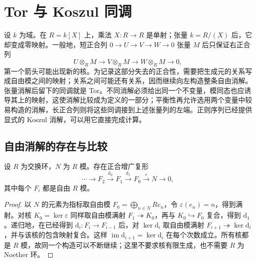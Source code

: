 
\section{Tor 与 Koszul 同调}
\label{b3:sec:1505}

设 \(k\) 为域。在 \(R=k[X]\) 上，乘法 \(X:R\rightarrow R\) 是单射；张量 \(k=R/(X)\) 后，它却变成零映射。一般地，短正合列 \(0\to U\to V\to W\to0\) 张量 \(M\) 后只保证右正合列
\[
	U\otimes_RM\longrightarrow V\otimes_RM \longrightarrow W\otimes_RM\longrightarrow0,
\]
第一个箭头可能出现新的核。为记录这部分失去的正合性，需要把生成元的关系写成自由模之间的映射；关系之间可能还有关系，因而继续向左构造整条自由消解。张量消解后留下的同调就是 Tor。不同消解必须给出同一个不变量，模同态也应诱导其上的映射，这使消解比较成为定义的一部分；平衡性再允许选用两个变量中较易构造的消解，长正合列则将这些同调接到上述张量列的左端。正则序列已经提供显式的 Koszul 消解，可以用它直接完成计算。

%
%
%

\subsection{自由消解的存在与比较}
\label{b3:subsec:1505:01}
\label{b3:subsec:1504:03}

\begin{lemma}[自由消解的存在性]\label{b3:lem:free-resolution-existence}
	设 \(R\) 为交换环，\(N\) 为 \(R\) 模。存在正合增广复形
	\[
		\cdots\longrightarrow F_2\xrightarrow{\mathrm{d}_2}F_1 \xrightarrow{\mathrm{d}_1}F_0\xrightarrow{\varepsilon}N\longrightarrow0,
	\]
	其中每个 \(F_i\) 都是自由 \(R\) 模。
\end{lemma}
\begin{proof}
	以 \(N\) 的元素为指标取自由模 \(F_0=\bigoplus_{n\in N}Re_n\)，令 \(\varepsilon(e_n)=n\)，得到满射。对核 \(K_0=\ker\varepsilon\) 同样取自由模满射 \(F_1\twoheadrightarrow K_0\)，再与 \(K_0\hookrightarrow F_0\) 复合，得到 \(\mathrm{d}_1\)。递归地，在已经得到 \(\mathrm{d}_i:F_i\rightarrow F_{i-1}\) 后，对 \(\ker\mathrm{d}_i\) 取自由模满射 \(F_{i+1}\twoheadrightarrow\ker\mathrm{d}_i\)，并与该核的包含映射复合。这样 \(\operatorname{im}\mathrm{d}_{i+1}=\ker\mathrm{d}_i\) 在每个次数成立。所有核都是 \(R\) 模，故同一个构造可以不断继续；这里不要求核有限生成，也不需要 \(R\) 为 Noether 环。
\end{proof}

